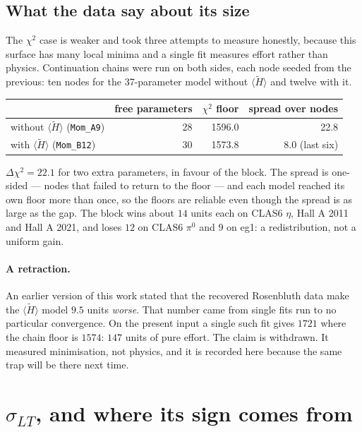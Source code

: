 \documentclass[11pt,a4paper]{article}
\newcommand{\sig}[1]{\sigma_{#1}}
\begin{document}
\subsection{What the data say about its size}

The $\chi^2$ case is weaker and took three attempts to measure honestly,
because this surface has many local minima and a single fit measures effort
rather than physics.  Continuation chains were run on both sides, each node
seeded from the previous: ten nodes for the 37-parameter model without
$\langle\tilde H\rangle$ and twelve with it.

\begin{center}
\begin{tabular}{lrrr}
\toprule
& free parameters & $\chi^2$ floor & spread over nodes\\
\midrule
without $\langle\tilde H\rangle$ (\texttt{Mom\_A9}) & 28 & 1596.0 & 22.8\\
with $\langle\tilde H\rangle$ (\texttt{Mom\_B12})   & 30 & 1573.8 & 8.0 (last six)\\
\bottomrule
\end{tabular}
\end{center}

$\Delta\chi^2 = 22.1$ for two extra parameters, in favour of the block.  The
spread is one-sided --- nodes that failed to return to the floor --- and each
model reached its own floor more than once, so the floors are reliable even
though the spread is as large as the gap.  The block wins about $14$ units each
on CLAS6 $\eta$, Hall A 2011 and Hall A 2021, and loses $12$ on CLAS6 $\pi^0$
and $9$ on eg1: a redistribution, not a uniform gain.

\paragraph{A retraction.}  An earlier version of this work stated that the
recovered Rosenbluth data make the $\langle\tilde H\rangle$ model $9.5$ units
\emph{worse}.  That number came from single fits run to no particular
convergence.  On the present input a single such fit gives $1721$ where the
chain floor is $1574$: $147$ units of pure effort.  The claim is withdrawn.  It
measured minimisation, not physics, and it is recorded here because the same
trap will be there next time.

\section{$\sig{LT}$, and where its sign comes from}
\label{sec:sigmalt}
\end{document}
